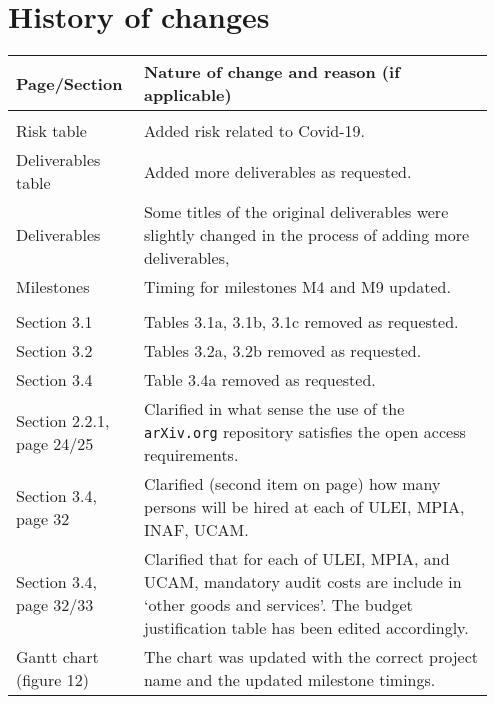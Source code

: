 \section*{History of changes}

\begin{tabular}{|>{\raggedright}p{0.25\linewidth}|>{\raggedright}p{0.7\linewidth}|}
\hline
\textbf{Page/Section} & \textbf{Nature of change and reason (if applicable)} \tabularnewline
\hline
\multicolumn{2}{|l|}{\textbf{Part A}} \tabularnewline
\hline
Risk table & Added risk related to Covid-19. \tabularnewline
\hline
Deliverables table & Added more deliverables as requested. \tabularnewline
\hline
Deliverables & Some titles of the original deliverables were slightly changed in the process of adding more deliverables, \tabularnewline
\hline
Milestones & Timing for milestones M4 and M9 updated. \tabularnewline
\hline
\multicolumn{2}{|l|}{\textbf{Part B}} \tabularnewline
\hline
Section 3.1 & Tables 3.1a, 3.1b, 3.1c removed as requested. \tabularnewline
\hline
Section 3.2 & Tables 3.2a, 3.2b removed as requested. \tabularnewline
\hline
Section 3.4 & Table 3.4a removed as requested. \tabularnewline
\hline
Section 2.2.1, page 24/25 & Clarified in what sense the use of the \texttt{arXiv.org} repository satisfies the open access requirements. \tabularnewline
\hline
Section 3.4, page 32 & Clarified (second item on page) how many persons will be hired at each of ULEI, MPIA, INAF, UCAM. \tabularnewline
\hline
Section 3.4, page 32/33 & Clarified that for each of ULEI, MPIA, and UCAM, mandatory audit costs are include in `other goods and services'. The budget justification table has been edited accordingly. \tabularnewline
\hline 
Gantt chart (figure 12) & The chart was updated with the correct project name and the updated milestone timings. \tabularnewline
\hline
\end{tabular}